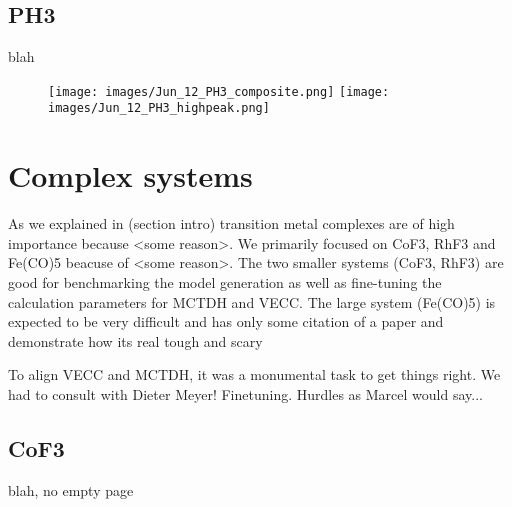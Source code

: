 \subsection{PH3}
blah
\begin{figure}[H]
    \center
    \texttt{[image: images/Jun\_12\_PH3\_composite.png]}
    \texttt{[image: images/Jun\_12\_PH3\_highpeak.png]}
\end{figure}

\section{Complex systems}
As we explained in (section intro) transition metal complexes are of high importance because <some reason>.
We primarily focused on CoF3, RhF3 and Fe(CO)5 beacuse of <some reason>.
The two smaller systems (CoF3, RhF3) are good for benchmarking the model generation as well as fine-tuning the calculation parameters for MCTDH and VECC.
The large system (Fe(CO)5) is expected to be very difficult and has only some citation of a paper and demonstrate how its real tough and scary

To align VECC and MCTDH, it was a monumental task to get things right. We had to consult with Dieter Meyer! Finetuning. Hurdles as Marcel would say...


\subsection{CoF3}
blah, no empty page \\

